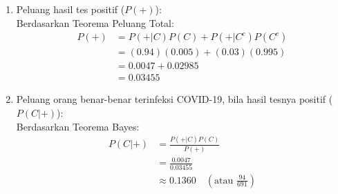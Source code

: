 \documentclass[11pt,letterpaper]{article}
\begin{document}
\begin{enumerate}
        \begin{enumerate}[label=\alph*.]
          \item Peluang hasil tes positif ($P(+)$): \\
                Berdasarkan Teorema Peluang Total:
                \begin{align*}
                  P(+) & = P(+|C)P(C) + P(+|C^c)P(C^c)   \\
                       & = (0.94)(0.005) + (0.03)(0.995) \\
                       & = 0.0047 + 0.02985              \\
                       & = 0.03455
                \end{align*}
          \item Peluang orang benar-benar terinfeksi COVID-19, bila hasil tesnya positif ($P(C|+)$): \\
                Berdasarkan Teorema Bayes:
                \begin{align*}
                  P(C|+) & = \frac{P(+|C)P(C)}{P(+)}                          \\
                         & = \frac{0.0047}{0.03455}                           \\
                         & \approx 0.1360 \quad (\text{atau } \frac{94}{691})
                \end{align*}
        \end{enumerate}
        \vspace{0.3cm}


\end{enumerate}
\end{document}
